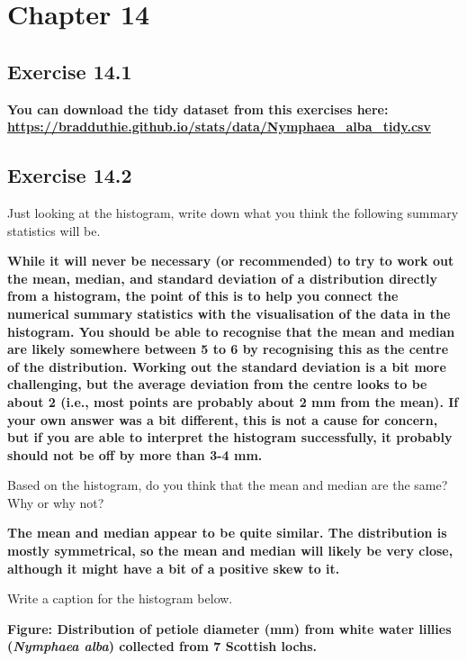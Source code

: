\documentclass[
  openany]{krantz}
\begin{document}
\hypertarget{chapter-14}{%
\section{Chapter 14}\label{chapter-14}}

\hypertarget{exercise-14.1}{%
\subsection{Exercise 14.1}\label{exercise-14.1}}

\textbf{You can download the tidy dataset from this exercises here: \url{https://bradduthie.github.io/stats/data/Nymphaea_alba_tidy.csv}}

\hypertarget{exercise-14.2}{%
\subsection{Exercise 14.2}\label{exercise-14.2}}

Just looking at the histogram, write down what you think the following summary statistics will be.

\textbf{While it will never be necessary (or recommended) to try to work out the mean, median, and standard deviation of a distribution directly from a histogram, the point of this is to help you connect the numerical summary statistics with the visualisation of the data in the histogram. You should be able to recognise that the mean and median are likely somewhere between 5 to 6 by recognising this as the centre of the distribution. Working out the standard deviation is a bit more challenging, but the average deviation from the centre looks to be about 2 (i.e., most points are probably about 2 mm from the mean). If your own answer was a bit different, this is not a cause for concern, but if you are able to interpret the histogram successfully, it probably should not be off by more than 3-4 mm.}

Based on the histogram, do you think that the mean and median are the same? Why or why
not?

\textbf{The mean and median appear to be quite similar. The distribution is mostly symmetrical, so the mean and median will likely be very close, although it might have a bit of a positive skew to it.}

Write a caption for the histogram below.

\textbf{Figure: Distribution of petiole diameter (mm) from white water lillies (\emph{Nymphaea alba}) collected from 7 Scottish lochs.}
\end{document}
